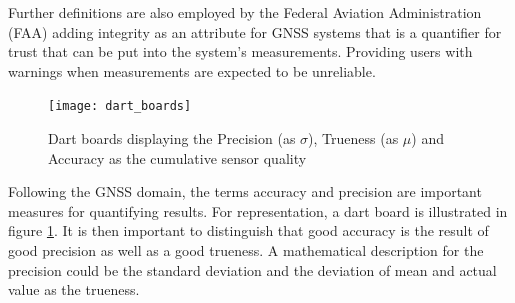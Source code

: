 Further definitions are also employed by the Federal Aviation Administration (FAA) adding integrity as an attribute for GNSS systems that is a quantifier for trust that can be put into the system's measurements. Providing users with warnings when measurements are expected to be unreliable. \cite[B.1.5, B.1.10]{faa_federal_radionavigation_plan_2008}

\begin{figure}[h]
    \centering
    \texttt{[image: dart\_boards]}
    \caption{Dart boards displaying the Precision (as $\sigma$), Trueness (as $\mu$) and Accuracy as the cumulative sensor quality \cite{iso_iso5725-1_accuracy_1997}}
    \label{fig:dart_boards}
\end{figure}

Following the GNSS domain, the terms accuracy and precision are important measures for quantifying results. For representation, a dart board is illustrated in figure \ref{fig:dart_boards}. It is then important to distinguish that good accuracy is the result of good precision as well as a good trueness. A mathematical description for the precision could be the standard deviation and the deviation of mean and actual value as the trueness. \cite{iso_iso5725-1_accuracy_1997}\cite[S.33ff.]{smith_scientist_1999}




